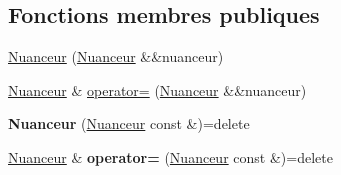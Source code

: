 \subsection*{Fonctions membres publiques}
\begin{DoxyCompactItemize}
\item 
\hyperlink{classopengl_1_1_nuanceur_a47a89b5dbdf854997139082031f2a3b3}{Nuanceur} (\hyperlink{classopengl_1_1_nuanceur}{Nuanceur} \&\&nuanceur)
\item 
\hyperlink{classopengl_1_1_nuanceur}{Nuanceur} \& \hyperlink{classopengl_1_1_nuanceur_a1e82b8585d2e08f18ba4e030c43d46f7}{operator=} (\hyperlink{classopengl_1_1_nuanceur}{Nuanceur} \&\&nuanceur)
\item 
\hypertarget{classopengl_1_1_nuanceur_aac445c30d61ff2c71550e070f9a51cba}{{\bfseries Nuanceur} (\hyperlink{classopengl_1_1_nuanceur}{Nuanceur} const \&)=delete}\label{classopengl_1_1_nuanceur_aac445c30d61ff2c71550e070f9a51cba}

\item 
\hypertarget{classopengl_1_1_nuanceur_aa68174578a648b9bc4ae6115bff5606d}{\hyperlink{classopengl_1_1_nuanceur}{Nuanceur} \& {\bfseries operator=} (\hyperlink{classopengl_1_1_nuanceur}{Nuanceur} const \&)=delete}\label{classopengl_1_1_nuanceur_aa68174578a648b9bc4ae6115bff5606d}


\end{DoxyCompactItemize}
